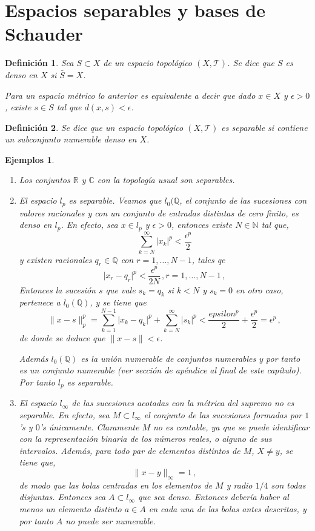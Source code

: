 \documentclass[12pt]{book}
\newtheorem{defn}{\bf Definición}[chapter]
\newtheorem{listaejemplos}{\bf Ejemplos}[chapter]
\def\beginejems{\begin{listaejemplos}\quad\begin{enumerate}}
\def\endejems{\end{enumerate}\end{listaejemplos}}
\def\NN{\mathbb{N}}
\def\QQ{\mathbb{Q}}
\def\RR{\mathbb{R}}
\def\CC{\mathbb{C}}
\newcommand{\abs}[1]{\lvert #1\rvert }
\newcommand{\norm}[1]{\lVert #1\rVert }
\begin{document}
\section{Espacios  separables y bases de Schauder}
\begin{defn} Sea $S\subset X$ de un espacio topológico $(X,\mathcal{T})$. Se dice que $S$  es 
denso  en $X$ si $\bar{S}=X$.

Para un espacio métrico lo anterior es equivalente a decir  que  dado $x\in X$ y $\epsilon>0$, 
existe $s\in S$ tal que $d(x,s)<\epsilon$.
\end{defn}
\begin{defn} Se dice que un espacio topológico $(X,\mathcal{T})$  es separable si contiene un 
subconjunto numerable denso en $X$.
\end{defn}
\beginejems
\item Los conjuntos $\RR$ y $\CC$ con la topología usual son separables.
\item  El espacio $l_p$  es separable. Veamos que $l_0(\QQ$, el conjunto de las sucesiones con 
valores racionales y con un conjunto de entradas distintas de cero finito,  es denso en $l_p$.  En 
efecto, sea $x\in l_p$ y $\epsilon>0$, entonces existe $N\in\NN$ tal que,
$$\sum_{k=N}^\infty  \abs{x_k}^p <\frac{\epsilon^p}{2}$$
y existen racionales $q_r\in \QQ$ con $r=1,\dots,N-1$, tales qe
$$\abs{x_r-q_r}^p<\frac{\epsilon^p}{2N}\,,r=1,\dots,N-1\,,$$
Entonces la sucesión $s$ que vale $s_k=q_k$ si $k<N$ y $s_k=0$ en otro caso, pertenece a 
$l_0(\QQ)$,  y se tiene que$$\norm{x-s}_p^p =\sum_{k=1}^{N-1}\abs{x_k-q_k}^p+\sum_{k=N}
^\infty\abs{s_k}^p<\frac{epsilon^p}{2}+\frac{\epsilon^p}{2}=\epsilon^p\,,$$ 
de donde  se deduce que $\norm{x-s}<\epsilon$.

Además $l_0(\QQ)$  es la unión numerable  de conjuntos numerables  y  por tanto es un conjunto 
numerable (ver sección de apéndice al final de este capítulo). Por tanto $l_p$ es separable.

\item  El espacio $l_\infty$ de las sucesiones acotadas con la métrica del supremo no  es 
separable. En efecto, sea $M\subset l_\infty$  el conjunto de las sucesiones formadas por $1$'s y 
$0$'s únicamente. Claramente $M$ no es contable, ya que se puede identificar con la 
representación binaria de los números reales, o alguno de sus intervalos. Además, para todo par 
de  elementos distintos de $M$, $X\not=y$, se tiene que,
$$\norm{x-y}_\infty=1\,,$$
de modo que las bolas centradas en los elementos de $M$ y radio $1/4$ son todas disjuntas.
 Entonces sea $A\subset l_\infty$ que sea denso. Entonces debería haber al menos un  elemento 
distinto  $a\in A$ en cada una de las bolas antes descritas, y por tanto $A$ no puede ser 
numerable.  
\endejems
\end{document}
